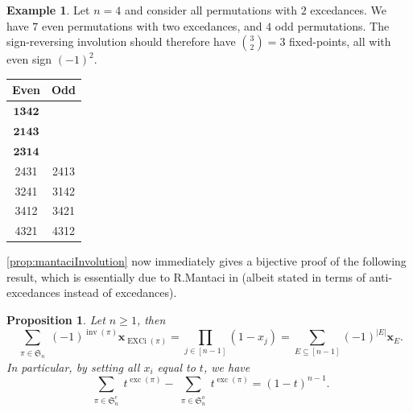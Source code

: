 \documentclass[reqno]{amsart}
\newtheorem{proposition}[theorem]{Proposition}
\theoremstyle{definition}
\newtheorem{example}[theorem]{Example}
\newcommand{\xvec}{\mathbf{x}}
\newcommand{\symS}{\mathfrak{S}}
\DeclareMathOperator{\inv}{inv}
\DeclareMathOperator{\exc}{exc}
\DeclareMathOperator{\EXCi}{EXCi}
\begin{document}
\begin{example}
 Let $n=4$ and consider all permutations with $2$ excedances.
 We have $7$ even permutations with two excedances,
 and $4$ odd permutations. The sign-reversing involution should therefore have 
 $\binom{3}{2}=3$ fixed-points, all with even sign $(-1)^2$.
 \begin{center}
\begin{tabular}{cc}
Even & Odd \\
\toprule
$\mathbf{1342}$ & \\
$\mathbf{2143}$ & \\
$\mathbf{2314}$ & \\
2431 & 2413  \\
3241 & 3142 \\
3412 & 3421 \\
4321 & 4312 \\
\end{tabular}
\end{center}
\end{example}


\cref{prop:mantaciInvolution} now immediately gives a bijective proof of the following result, which is essentially due to R.Mantaci in \cite{Mantaci1993} (albeit stated in terms of anti-excedances instead of excedances).
\begin{proposition}\label{lem:excEvenOdd}
Let $n \geq 1$, then
\begin{equation}\label{eq:excEvenOdd}
 \sum_{\substack{\pi \in \symS_n}} (-1)^{\inv(\pi)} \xvec_{\EXCi(\pi)} = 
 \prod_{j \in [n-1]} (1-x_j) = \sum_{E \subseteq [n-1]} (-1)^{|E|}\xvec_{E}.
\end{equation}
In particular, by setting all $x_i$ equal to $t$, 
we have
\[
 \sum_{\substack{\pi \in \symS^e_n}} t^{\exc(\pi)} 
 -
 \sum_{\substack{\pi \in \symS^o_n }} t^{\exc(\pi)} = (1-t)^{n-1}.
\]
\end{proposition}
\end{document}
